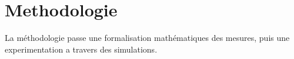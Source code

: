 \section{Methodologie}

La méthodologie passe une formalisation mathématiques des mesures, puis une experimentation a travers des simulations.